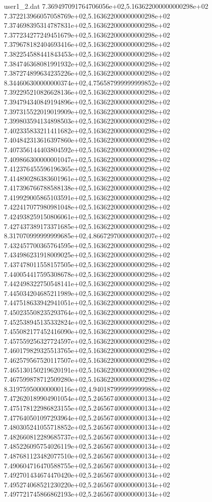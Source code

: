 \begin{filecontents}{user1_2.dat}
7.369497091764706056e+02,5.163622000000000298e+02
7.372213966057058769e+02,5.163622000000000298e+02
7.374698395314787831e+02,5.163622000000000298e+02
7.377234277249451679e+02,5.163622000000000298e+02
7.379678182404693416e+02,5.163622000000000298e+02
7.382254588441843453e+02,5.163622000000000298e+02
7.384746368081991932e+02,5.163622000000000298e+02
7.387274899634235226e+02,5.163622000000000298e+02
8.344606300000000374e+02,4.756587999999999852e+02
7.392295210826628136e+02,5.163622000000000298e+02
7.394794340849194896e+02,5.163622000000000298e+02
7.397315522019019909e+02,5.163622000000000298e+02
7.399803594134898503e+02,5.163622000000000298e+02
7.402335833211411682e+02,5.163622000000000298e+02
7.404842313616397860e+02,5.163622000000000298e+02
7.407356144403804592e+02,5.163622000000000298e+02
7.409866300000001047e+02,5.163622000000000298e+02
7.412376455596196365e+02,5.163622000000000298e+02
7.414890286383601961e+02,5.163622000000000298e+02
7.417396766788588138e+02,5.163622000000000298e+02
7.419929005865103591e+02,5.163622000000000298e+02
7.422417077980981048e+02,5.163622000000000298e+02
7.424938259150806061e+02,5.163622000000000298e+02
7.427437389173371685e+02,5.163622000000000298e+02
8.317070999999999685e+02,4.866729700000000207e+02
7.432457700365764595e+02,5.163622000000000298e+02
7.434986231918009025e+02,5.163622000000000298e+02
7.437478011558157505e+02,5.163622000000000298e+02
7.440054417595308678e+02,5.163622000000000298e+02
7.442498322750548141e+02,5.163622000000000298e+02
7.445034204685211989e+02,5.163622000000000298e+02
7.447518633942941051e+02,5.163622000000000298e+02
7.450235508235293764e+02,5.163622000000000298e+02
7.452538945135332824e+02,5.163622000000000298e+02
7.455082177452416090e+02,5.163622000000000298e+02
7.457559256327724597e+02,5.163622000000000298e+02
7.460179829325513765e+02,5.163622000000000298e+02
7.462579567520117507e+02,5.163622000000000298e+02
7.465130150219620191e+02,5.163622000000000298e+02
7.467599878712509280e+02,5.163622000000000298e+02
8.319759500000000116e+02,4.940187999999999988e+02
7.472620189904901054e+02,5.246567400000000134e+02
7.475178122986823155e+02,5.246567400000000134e+02
7.477640501097293964e+02,5.246567400000000134e+02
7.480305241055718852e+02,5.246567400000000134e+02
7.482660812289685737e+02,5.246567400000000134e+02
7.485226095754026119e+02,5.246567400000000134e+02
7.487681123482077510e+02,5.246567400000000134e+02
7.490604716470588755e+02,5.246567400000000134e+02
7.492701434674470420e+02,5.246567400000000134e+02
7.495274068521230220e+02,5.246567400000000134e+02
7.497721745866862193e+02,5.246567400000000134e+02

\end{filecontents}
